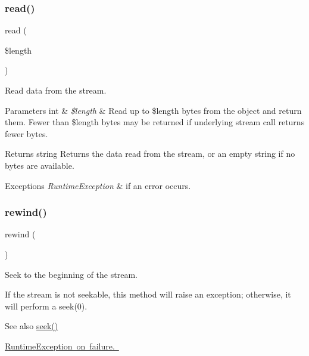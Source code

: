 \subsubsection{\texorpdfstring{read()}{read()}}
{\footnotesize\ttfamily read (\begin{DoxyParamCaption}\item[{}]{\$length }\end{DoxyParamCaption})}

Read data from the stream.


\begin{DoxyParams}[1]{Parameters}
int & {\em \$length} & Read up to \$length bytes from the object and return them. Fewer than \$length bytes may be returned if underlying stream call returns fewer bytes.\\
\hline
\end{DoxyParams}
\begin{DoxyReturn}{Returns}
string Returns the data read from the stream, or an empty string if no bytes are available.
\end{DoxyReturn}

\begin{DoxyExceptions}{Exceptions}
{\em Runtime\+Exception} & if an error occurs. \\
\hline
\end{DoxyExceptions}
\mbox{\label{class_pes_1_1_http_1_1_stream_ae619dcf2218c21549cb65d875bbc6c9c}} 
\subsubsection{\texorpdfstring{rewind()}{rewind()}}
{\footnotesize\ttfamily rewind (\begin{DoxyParamCaption}{ }\end{DoxyParamCaption})}

Seek to the beginning of the stream.

If the stream is not seekable, this method will raise an exception; otherwise, it will perform a seek(0).

\begin{DoxySeeAlso}{See also}
\mbox{\hyperlink{class_pes_1_1_http_1_1_stream_aa2ee0a47a0c37ae7ca7a04df34fc6d7a}{seek()}}
\end{DoxySeeAlso}
\mbox{\hyperlink{}{Runtime\+Exception on failure. }}\mbox{\label{class_pes_1_1_http_1_1_stream_aa2ee0a47a0c37ae7ca7a04df34fc6d7a}} 
